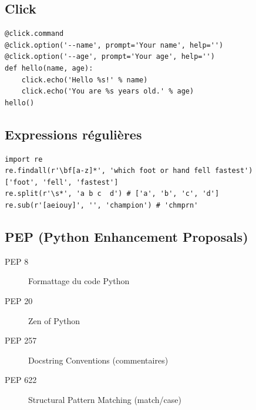 \documentclass{article}
\begin{document}
\begin{multicols*}{4}
\subsection*{Click}
\begin{lstlisting}
@click.command
@click.option('--name', prompt='Your name', help='')
@click.option('--age', prompt='Your age', help='')
def hello(name, age):
    click.echo('Hello %s!' % name)
    click.echo('You are %s years old.' % age)
hello() 
\end{lstlisting}

\subsection*{Expressions régulières}
\begin{lstlisting}
import re 
re.findall(r'\bf[a-z]*', 'which foot or hand fell fastest')
['foot', 'fell', 'fastest']
re.split(r'\s*', 'a b c  d') # ['a', 'b', 'c', 'd']
re.sub(r'[aeiouy]', '', 'champion') # 'chmprn'
\end{lstlisting}

\subsection*{PEP (Python Enhancement Proposals)}
\begin{description}
    \item[PEP 8] Formattage du code Python
    \item[PEP 20] Zen of Python 
    \item[PEP 257] Docstring Conventions (commentaires)
    \item[PEP 622] Structural Pattern Matching (match/case)  
\end{description}

\end{multicols*}
\end{document}
